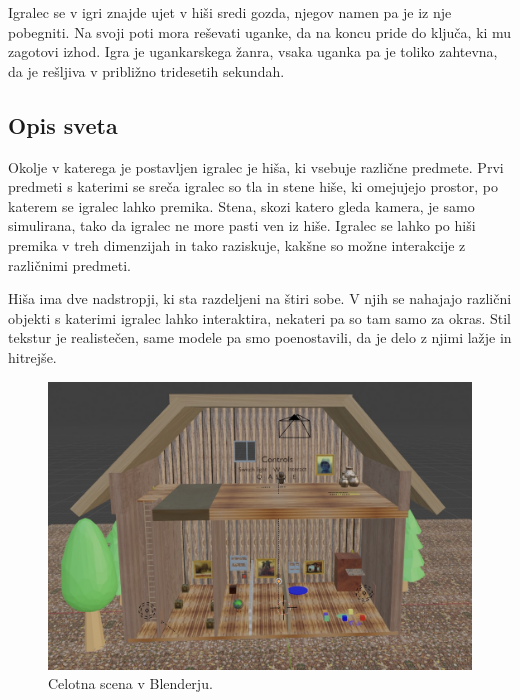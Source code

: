 \documentclass[a4paper,12pt]{article}
\begin{document}
Igralec se v igri znajde ujet v hiši sredi gozda, njegov namen pa je iz nje pobegniti. Na svoji poti mora reševati uganke, da na koncu pride do ključa, ki mu zagotovi izhod. Igra je ugankarskega žanra, vsaka uganka pa je toliko zahtevna, da je rešljiva v približno tridesetih sekundah.

\subsection{Opis sveta}
Okolje v katerega je postavljen igralec je hiša, ki vsebuje različne predmete. Prvi predmeti s katerimi se sreča igralec so tla in stene hiše, ki omejujejo prostor, po katerem se igralec lahko premika. Stena, skozi katero gleda kamera, je samo simulirana, tako da igralec ne more pasti ven iz hiše. Igralec se lahko po hiši premika v treh dimenzijah in tako raziskuje, kakšne so možne interakcije z različnimi predmeti.

Hiša ima dve nadstropji, ki sta razdeljeni na štiri sobe. V njih se nahajajo različni objekti s katerimi igralec lahko interaktira, nekateri pa so tam samo za okras. Stil tekstur je realistečen, same modele pa smo poenostavili, da je delo z njimi lažje in hitrejše.

\begin{figure}[!htb]
    \begin{center}
        \includegraphics[width=\columnwidth]{svet.jpg}
        \caption{Celotna scena v Blenderju.}
    \end{center}
\end{figure}
\end{document}
